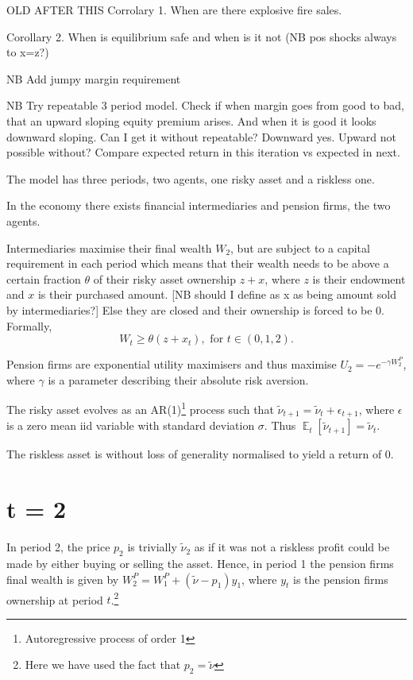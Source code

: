 \documentclass[11pt]{article}
\DeclareMathOperator{\E}{\mathbb{E}} %
\begin{document}
\newpage
OLD AFTER THIS
Corrolary 1. When are there explosive fire sales.

Corollary 2. When is equilibrium safe and when is it not (NB pos shocks always to x=z?)

\bigbreak

NB Add jumpy margin requirement

NB Try repeatable 3 period model. Check if when margin goes from good to bad, that an upward sloping equity premium arises. And when it is good it looks downward sloping. Can I get it without repeatable? Downward yes. Upward not possible without? Compare expected return in this iteration vs expected in next.

The model has three periods, two agents, one risky asset and a riskless one.

In the economy there exists financial intermediaries and pension firms, the two agents.

Intermediaries maximise their final wealth $W_2$, but are subject to a capital requirement in each period which means that  their wealth needs to be above a certain fraction $\theta$ of their risky asset ownership $z + x$, where $z$ is their endowment and $x$ is their purchased amount. [NB should I define as x as being amount sold by intermediaries?] Else they are closed and their ownership is forced to be 0. Formally,
\begin{equation}
W_t \geq \theta (z + x_t), \text{ for } t \in (0,1,2).
\end{equation} 

Pension firms are exponential utility maximisers and thus maximise
 $U_2 = -e^{-\gamma W_2^P}$, where $\gamma$ is a parameter describing their absolute risk aversion.

The risky asset evolves as an AR(1)\footnote{Autoregressive process of order 1} process such that $\tilde{\nu}_{t+1} = \tilde{\nu}_t + \epsilon_{t+1}$, where $\epsilon$ is a zero mean iid variable with standard deviation $\sigma$. Thus $\E_t[\tilde{\nu}_{t+1}] = \tilde{\nu}_t$.

The riskless asset is without loss of generality normalised to yield a return of 0.



\section*{t = 2}

In period 2, the price $p_2$ is trivially $\tilde{\nu}_2$ as if it was not a riskless profit could be made by either buying or selling the asset. Hence, in period 1 the pension firms final wealth is given by $W_2^P = W_1^P + (\tilde{\nu} - p_1)y_1$, where $y_t$ is the pension firms ownership at period $t$.\footnote{Here we have used the fact that $p_2 = \tilde{\nu}$}
\end{document}
